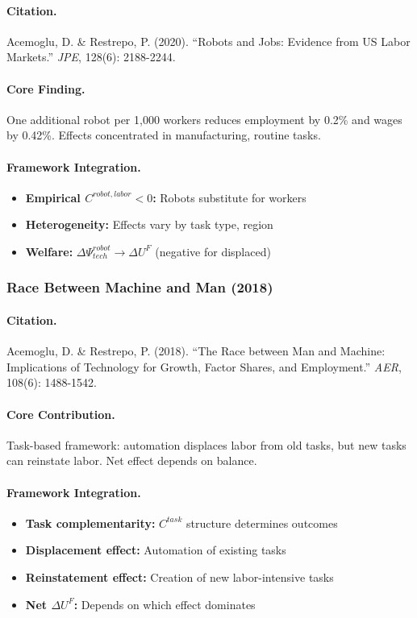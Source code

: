 \paragraph{Citation.}
Acemoglu, D. \& Restrepo, P. (2020).
``Robots and Jobs: Evidence from US Labor Markets.''
\emph{JPE}, 128(6): 2188-2244.

\paragraph{Core Finding.}
One additional robot per 1,000 workers reduces employment by 0.2\%
and wages by 0.42\%. Effects concentrated in manufacturing, routine tasks.

\paragraph{Framework Integration.}
\begin{itemize}
  \item \textbf{Empirical $C^{robot,labor} < 0$:} Robots substitute for workers
  \item \textbf{Heterogeneity:} Effects vary by task type, region
  \item \textbf{Welfare:} $\Delta\Psi_{tech}^{robot} \to \Delta U^F$ (negative for displaced)
\end{itemize}

\subsubsection{Race Between Machine and Man (2018)}

\paragraph{Citation.}
Acemoglu, D. \& Restrepo, P. (2018).
``The Race between Man and Machine: Implications of Technology for Growth,
Factor Shares, and Employment.'' \emph{AER}, 108(6): 1488-1542.

\paragraph{Core Contribution.}
Task-based framework: automation displaces labor from old tasks,
but new tasks can reinstate labor. Net effect depends on balance.

\paragraph{Framework Integration.}
\begin{itemize}
  \item \textbf{Task complementarity:} $C^{task}$ structure determines outcomes
  \item \textbf{Displacement effect:} Automation of existing tasks
  \item \textbf{Reinstatement effect:} Creation of new labor-intensive tasks
  \item \textbf{Net $\Delta U^F$:} Depends on which effect dominates
\end{itemize}

